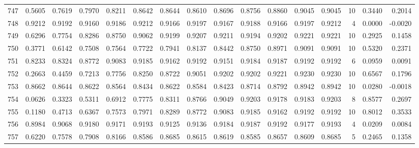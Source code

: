 \begin{tabular}{lrrrrrrrrrrrrrrr}
747 &      0.5605 &  0.7619 &  0.7970 &  0.8211 &  0.8642 &  0.8644 &  0.8610 &  0.8696 &  0.8756 &  0.8860 &   0.9045 &     0.9045 &     10 &                    0.3440 &                     0.2014 \\
748 &      0.9212 &  0.9192 &  0.9160 &  0.9186 &  0.9212 &  0.9166 &  0.9197 &  0.9167 &  0.9188 &  0.9166 &   0.9197 &     0.9212 &      4 &                    0.0000 &                    -0.0020 \\
749 &      0.6296 &  0.7754 &  0.8286 &  0.8750 &  0.9062 &  0.9199 &  0.9207 &  0.9211 &  0.9194 &  0.9202 &   0.9221 &     0.9221 &     10 &                    0.2925 &                     0.1458 \\
750 &      0.3771 &  0.6142 &  0.7508 &  0.7564 &  0.7722 &  0.7941 &  0.8137 &  0.8442 &  0.8750 &  0.8971 &   0.9091 &     0.9091 &     10 &                    0.5320 &                     0.2371 \\
751 &      0.8233 &  0.8324 &  0.8772 &  0.9083 &  0.9185 &  0.9162 &  0.9192 &  0.9151 &  0.9184 &  0.9187 &   0.9192 &     0.9192 &      6 &                    0.0959 &                     0.0091 \\
752 &      0.2663 &  0.4459 &  0.7213 &  0.7756 &  0.8250 &  0.8722 &  0.9051 &  0.9202 &  0.9202 &  0.9221 &   0.9230 &     0.9230 &     10 &                    0.6567 &                     0.1796 \\
753 &      0.8662 &  0.8644 &  0.8622 &  0.8564 &  0.8434 &  0.8622 &  0.8584 &  0.8423 &  0.8714 &  0.8792 &   0.8942 &     0.8942 &     10 &                    0.0280 &                    -0.0018 \\
754 &      0.0626 &  0.3323 &  0.5311 &  0.6912 &  0.7775 &  0.8311 &  0.8766 &  0.9049 &  0.9203 &  0.9178 &   0.9183 &     0.9203 &      8 &                    0.8577 &                     0.2697 \\
755 &      0.1180 &  0.4713 &  0.6367 &  0.7573 &  0.7971 &  0.8289 &  0.8772 &  0.9083 &  0.9185 &  0.9162 &   0.9192 &     0.9192 &     10 &                    0.8012 &                     0.3533 \\
756 &      0.8984 &  0.9068 &  0.9180 &  0.9171 &  0.9193 &  0.9125 &  0.9136 &  0.9184 &  0.9187 &  0.9192 &   0.9177 &     0.9193 &      4 &                    0.0209 &                     0.0084 \\
757 &      0.6220 &  0.7578 &  0.7908 &  0.8166 &  0.8586 &  0.8685 &  0.8615 &  0.8619 &  0.8585 &  0.8657 &   0.8609 &     0.8685 &      5 &                    0.2465 &                     0.1358 \\

\end{tabular}
